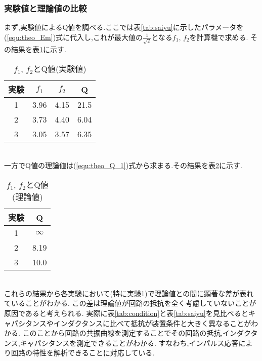 \subsubsection{実験値と理論値の比較}
まず,実験値によるQ値を調べる.ここでは表\ref{tab:saiyu}に示したパラメータを(\ref{equ:theo_Em})式に代入し,これが最大値の$\frac{1}{\sqrt{2}}$となる$f_1$, $f_2$を計算機で求める.
その結果を表\ref{tab:f1f2Q1}に示す.
\begin{table}[htbp]
   \caption{$f_1$, $f_2$とQ値(実験値)}
   \label{tab:f1f2Q1}
   \centering
   \begin{tabular}{c|ccc}
     \hline
     実験&$f_1$&$f_2$&Q\\
     \hline \hline
     1&3.96&4.15&21.5\\
     2&3.73&4.40&6.04\\
     3&3.05&3.57&6.35\\
     \hline
   \end{tabular}
\end{table}\\
一方でQ値の理論値は(\ref{equ:theo_Q_1})式から求まる.その結果を表\ref{tab:f1f2Q2}に示す.
\begin{table}[htbp]
  \caption{$f_1$, $f_2$とQ値(理論値)}
  \label{tab:f1f2Q2}
  \centering
  \begin{tabular}{c|c}
    \hline
    実験&Q\\
    \hline \hline
    1&$\infty$\\
    2&8.19\\
    3&10.0\\
    \hline
  \end{tabular}
\end{table}\\
これらの結果から各実験において(特に実験1)で理論値との間に顕著な差が表れていることがわかる.
この差は理論値が回路の抵抗を全く考慮していないことが原因であると考えられる.
実際に表\ref{tab:condition}と表\ref{tab:saiyu}を見比べるとキャパシタンスやインダクタンスに比べて抵抗が装置条件と大きく異なることがわかる.
このことから回路の共振曲線を測定することでその回路の抵抗,インダクタンス,キャパシタンスを測定できることがわかる.
すなわち,インパルス応答により回路の特性を解析できることに対応している.
